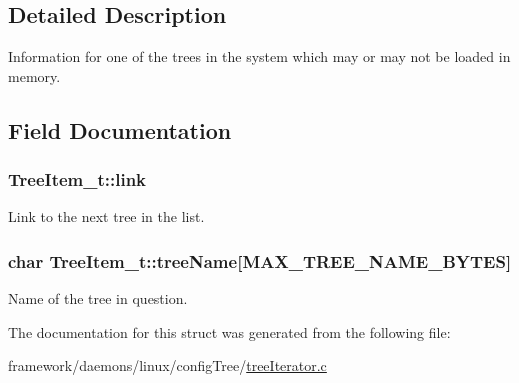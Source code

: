 \subsection{Detailed Description}
Information for one of the trees in the system which may or may not be loaded in memory. 

\subsection{Field Documentation}
\subsubsection[{\texorpdfstring{link}{link}}]{ Tree\+Item\+\_\+t\+::link}\hypertarget{struct_tree_item__t_af173615de9036966192a6c596883a4b8}{}\label{struct_tree_item__t_af173615de9036966192a6c596883a4b8}


Link to the next tree in the list. 

\subsubsection[{\texorpdfstring{tree\+Name}{treeName}}]{\setlength{\rightskip}{0pt plus 5cm}char Tree\+Item\+\_\+t\+::tree\+Name\mbox{[}{\bf M\+A\+X\+\_\+\+T\+R\+E\+E\+\_\+\+N\+A\+M\+E\+\_\+\+B\+Y\+T\+ES}\mbox{]}}\hypertarget{struct_tree_item__t_a0aaca769d9960e2506d2a303afd010e0}{}\label{struct_tree_item__t_a0aaca769d9960e2506d2a303afd010e0}


Name of the tree in question. 



The documentation for this struct was generated from the following file\+:\begin{DoxyCompactItemize}
\item 
framework/daemons/linux/config\+Tree/\hyperlink{tree_iterator_8c}{tree\+Iterator.\+c}\end{DoxyCompactItemize}
